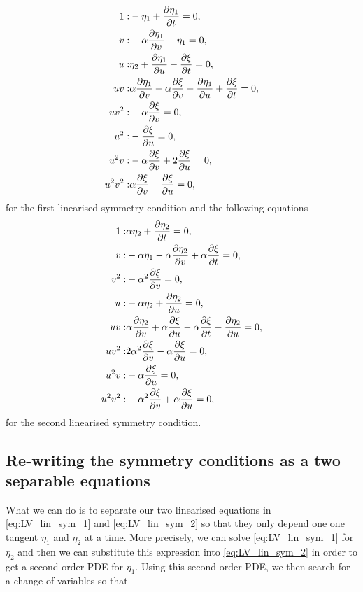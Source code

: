 \begin{align}
1:&- \eta_1 +\pdv{\eta_1}{t}=0,\\
v:&- \alpha \pdv{\eta_1}{v}  + \eta_1=0,\\
u:&\eta_2 + \pdv{\eta_1}{u}  - \pdv{\xi}{t}=0,\\
u v:&\alpha \pdv{\eta_1}{v}  + \alpha \pdv{\xi}{v}  - \pdv{\eta_1}{u}  + \pdv{\xi}{t}=0,\\
u v^{2}:&- \alpha \pdv{\xi}{v} =0,\\
u^{2}:&- \pdv{\xi}{u} =0,\\
u^{2} v:&- \alpha \pdv{\xi}{v}  + 2 \pdv{\xi}{u} =0,\\
u^{2} v^{2}:&\alpha \pdv{\xi}{v} - \pdv{\xi}{u}=0,
\end{align}
for the first linearised symmetry condition and the following equations
\begin{align}
1:&\alpha \eta_2 + \pdv{\eta_2}{t}=0,\\
v:&- \alpha \eta_1 - \alpha \pdv{\eta_2}{v}  + \alpha \pdv{\xi}{t}=0,\\
v^{2}:&- \alpha^{2} \pdv{\xi}{v} =0,\\
u:&- \alpha \eta_2 + \pdv{\eta_2}{u} =0,\\
u v:&\alpha \pdv{\eta_2}{v}  + \alpha \pdv{\xi}{u}  - \alpha \pdv{\xi}{t} - \pdv{\eta_2}{u} =0,\\
u v^{2}:&2 \alpha^{2} \pdv{\xi}{v}  - \alpha \pdv{\xi}{u} =0,\\
u^{2} v:&- \alpha \pdv{\xi}{u} =0,\\
u^{2} v^{2}:&- \alpha^{2} \pdv{\xi}{v}  + \alpha \pdv{\xi}{u} =0,
\end{align}
for the second linearised symmetry condition.

\subsection{Re-writing the symmetry conditions as a two separable equations}
What we can do is to separate our two linearised equations in \eqref{eq:LV_lin_sym_1} and \eqref{eq:LV_lin_sym_2} so that they only depend one one tangent $\eta_1$ and $\eta_2$ at a time. More precisely, we can solve \eqref{eq:LV_lin_sym_1} for $\eta_2$ and then we can substitute this expression into \eqref{eq:LV_lin_sym_2} in order to get a second order PDE for $\eta_1$. Using this second order PDE, we then search for a change of variables so that 